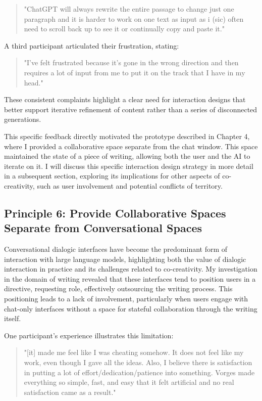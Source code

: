 \begin{quote}
"ChatGPT will always rewrite the entire passage to change just one paragraph and it is harder to work on one text as input as i (sic) often need to scroll back up to see it or continually copy and paste it."
\end{quote}

A third participant articulated their frustration, stating:

\begin{quote}
"I've felt frustrated because it's gone in the wrong direction and then requires a lot of input from me to put it on the track that I have in my head."
\end{quote}

These consistent complaints highlight a clear need for interaction designs that better support iterative refinement of content rather than a series of disconnected generations. 


This specific feedback directly motivated the prototype described in Chapter 4, where I provided a collaborative space separate from the chat window. This space maintained the state of a piece of writing, allowing both the user and the AI to iterate on it. I will discuss this specific interaction design strategy in more detail in a subsequent section, exploring its implications for other aspects of co-creativity, such as user involvement and potential conflicts of territory.


\subsection{Principle 6: Provide Collaborative Spaces Separate from Conversational Spaces}

Conversational dialogic interfaces have become the predominant form of interaction with large language models, highlighting both the value of dialogic interaction in practice and its challenges related to co-creativity. My investigation in the domain of writing revealed that these interfaces tend to position users in a directive, requesting role, effectively outsourcing the writing process. This positioning leads to a lack of involvement, particularly when users engage with chat-only interfaces without a space for stateful collaboration through the writing itself.

One participant's experience illustrates this limitation:

\begin{quote}
"[it] made me feel like I was cheating somehow. It does not feel like my work, even though I gave all the ideas. Also, I believe there is satisfaction in putting a lot of effort/dedication/patience into something. Vorges made everything so simple, fast, and easy that it felt artificial and no real satisfaction came as a result."
\end{quote}

